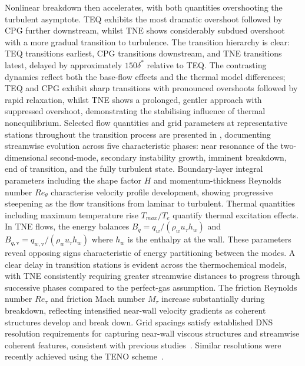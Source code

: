 Nonlinear breakdown then accelerates, with both quantities overshooting the turbulent asymptote. \gls{TEQ} exhibits the most dramatic overshoot followed by \gls{CPG} further downstream, whilst \gls{TNE} shows considerably subdued overshoot with a more gradual transition to turbulence. The transition hierarchy is clear: \gls{TEQ} transitions earliest, \gls{CPG} transitions downstream, and \gls{TNE} transitions latest, delayed by approximately $150\delta^*$ relative to \gls{TEQ}. The contrasting dynamics reflect both the base-flow effects and the thermal model differences; \gls{TEQ} and \gls{CPG} exhibit sharp transitions with pronounced overshoots followed by rapid relaxation, whilst \gls{TNE} shows a prolonged, gentler approach with suppressed overshoot, demonstrating the stabilising influence of thermal nonequilibrium. Selected flow quantities and grid parameters at representative stations throughout the transition process are presented in , documenting streamwise evolution across five characteristic phases: near resonance of the two-dimensional second-mode, secondary instability growth, imminent breakdown, end of transition, and the fully turbulent state. Boundary-layer integral parameters including the shape factor $H$ and momentum-thickness Reynolds number $Re_\theta$ characterise velocity profile development, showing progressive steepening as the flow transitions from laminar to turbulent. Thermal quantities including maximum temperature rise $T_{max}/T_e$ quantify thermal excitation effects. In \gls{TNE} flows, the energy balances $B_q = q_w/(\rho_w u_\tau h_w)$ and $B_{q,\mathrm{v}} = q_{w,\mathrm{v}}/(\rho_w u_\tau h_w)$ where $h_w$ is the enthalpy at the wall. These parameters reveal opposing signs characteristic of energy partitioning between the modes. A clear delay in transition stations is evident across the thermochemical models, with \gls{TNE} consistently requiring greater streamwise distances to progress through successive phases compared to the perfect-gas assumption. The friction Reynolds number $Re_\tau$ and friction Mach number $M_\tau$ increase substantially during breakdown, reflecting intensified near-wall velocity gradients as coherent structures develop and break down. Grid spacings satisfy established \gls{DNS} resolution requirements for capturing near-wall viscous structures and streamwise coherent features, consistent with previous studies~\citep{PoggieEtAl2015}. Similar resolutions were recently achieved using the TENO scheme~\citep{Williamsetal2025}.

